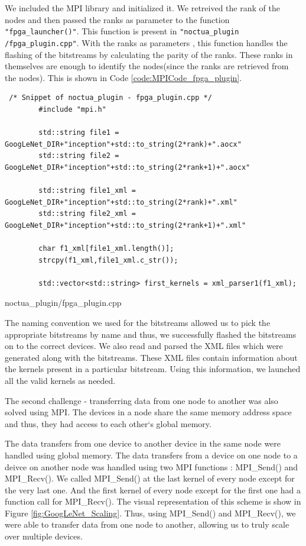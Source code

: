 We included the MPI library and initialized it. We retreived the rank of the nodes and then passed the ranks as parameter to the function \texttt{"fpga\_launcher()"}. This function is present in \texttt{"noctua\_plugin /fpga\_plugin.cpp"}. With the ranks as parameters , this function handles the flashing of the bitstreams by calculating the parity of the ranks. These ranks in themselves are enough to identify the nodes(since the ranks are retrieved from the nodes). This is shown in Code \ref{code:MPICode_fpga_plugin}.

\begin{code}[!htb]
 \begin{verbatim}
 /* Snippet of noctua_plugin - fpga_plugin.cpp */
        #include "mpi.h"  
        
        std::string file1 = GoogLeNet_DIR+"inception"+std::to_string(2*rank)+".aocx" 
        std::string file2 = GoogLeNet_DIR+"inception"+std::to_string(2*rank+1)+".aocx"  
        
        std::string file1_xml = GoogLeNet_DIR+"inception"+std::to_string(2*rank)+".xml"
        std::string file2_xml = GoogLeNet_DIR+"inception"+std::to_string(2*rank+1)+".xml"   
        
        char f1_xml[file1_xml.length()];
        strcpy(f1_xml,file1_xml.c_str());  
        
        std::vector<std::string> first_kernels = xml_parser1(f1_xml);

\end{verbatim}
\caption{noctua\_plugin/fpga\_plugin.cpp}
\label{code:MPICode_fpga_plugin}
\end{code}

The naming convention we used for the bitstreams allowed us to pick the appropriate bitstreams by  name and thus, we successfully flashed the bitstreams on to the correct devices. We also read and parsed the XML files which were generated along with the bitstreams. These XML files contain information about the kernels present in a particular bitstream. Using this information, we launched all the valid kernels as needed. 

The second challenge - transferring data from one node to another was also solved using MPI. The devices in a node share the same memory address space and thus, they had access to each other`s global memory.   

The data transfers from one device to another device in the same node were handled using global memory. The data transfers from a device on one node to a deivce on another node was handled using two MPI functions : MPI\_Send() and MPI\_Recv(). We called MPI\_Send() at the last kernel of every node except for the very last one. And the first kernel of every node except for the first one had a function call for MPI\_Recv(). The visual representation of this scheme is show in Figure \ref{fig:GoogLeNet_Scaling}. Thus, using  MPI\_Send() and MPI\_Recv(), we were able to transfer data from one node to another, allowing us to truly scale over multiple devices.

